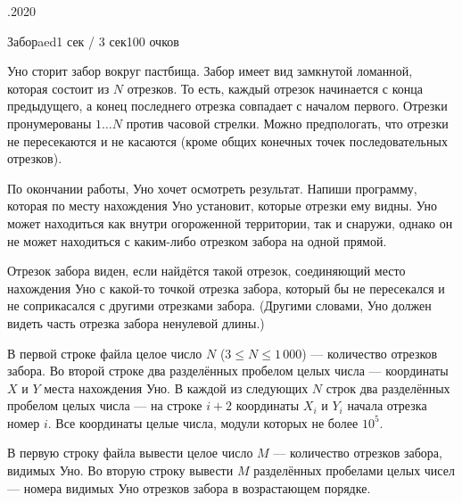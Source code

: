 \documentclass[a4paper,11pt]{article}
\begin{document}
\begin{ol}{\eio}{.2020}{\yle}{}
\begin{yl}{1}{Забор}{aed}{1 сек / 3 сек}{100 очков}

Уно сторит забор вокруг пастбища. Забор имеет вид замкнутой ломанной, которая состоит из $N$ отрезков. То есть, каждый отрезок начинается с конца предыдущего, а конец последнего отрезка совпадает с началом первого. Отрезки пронумерованы $1 \ldots N$ против часовой стрелки. Можно предпологать, что отрезки не пересекаются и не касаются (кроме общих конечных точек последовательных отрезков).

По окончании работы, Уно хочет осмотреть результат. Напиши программу, которая по месту нахождения Уно установит, которые отрезки ему видны. Уно может находиться как внутри огороженной территории, так и снаружи, однако он не может находиться с каким-либо отрезком забора на одной прямой.

Отрезок забора виден, если найдётся такой отрезок, соединяющий место нахождения Уно с какой-то точкой отрезка забора, который бы не пересекался и не соприкасался с другими отрезками забора. (Другими словами, Уно должен видеть часть отрезка забора ненулевой длины.)

\sis В первой строке файла \sisf целое число $N$ ($3 \le N \le 1\,000$) --- количество отрезков забора. Во второй строке два разделённых пробелом целых числа --- координаты $X$ и $Y$ места нахождения Уно. В каждой из следующих $N$ строк два разделённых пробелом целых числа --- на строке $i + 2$ координаты $X_i$ и $Y_i$ начала отрезка номер $i$. Все координаты целые числа, модули которых не более $10^5$.

\val В первую строку файла \valf вывести целое число $M$ --- количество отрезков забора, видимых Уно. Во вторую строку вывести $M$ разделённых пробелами целых чисел --- номера видимых Уно отрезков забора в возрастающем порядке.


\end{yl}
\end{ol}
\end{document}
